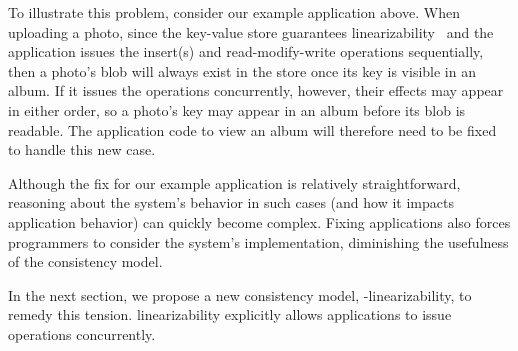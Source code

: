 To illustrate this problem, consider our example application above.
When uploading a photo, since the key-value store guarantees
linearizability~\cite{herlihy1990linearizability} and the application issues the
insert(s) and read-modify-write operations sequentially, then a photo's blob will
always exist in the store once its key is visible in an album.
If it issues the operations concurrently, however, their effects may appear in either order,
so a photo's key may appear in an album before its blob is readable.
The application code to view an album will therefore need to be fixed to handle this new case.

Although the fix for our example application is relatively straightforward,
reasoning about the system's behavior in such cases (and how it impacts application behavior)
can quickly become complex.
Fixing applications also forces programmers to consider the system's implementation,
diminishing the usefulness of the consistency model.

In the next section, we propose a new \multidispatch{} 
consistency model, \md{}-linearizability, to remedy this 
tension. \Multidispatch{} linearizability explicitly allows 
applications to issue operations concurrently.

